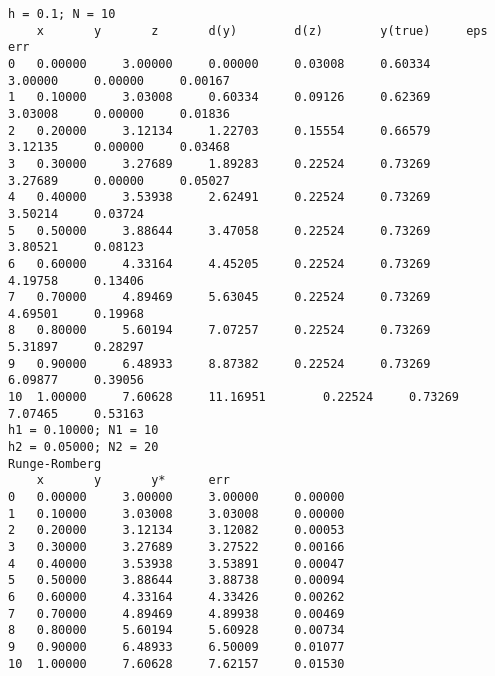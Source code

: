\begin{verbatim}
h = 0.1; N = 10
	x		y		z		d(y)		d(z)		y(true)		eps		err
0	0.00000		3.00000		0.00000		0.03008		0.60334		3.00000		0.00000		0.00167
1	0.10000		3.03008		0.60334		0.09126		0.62369		3.03008		0.00000		0.01836
2	0.20000		3.12134		1.22703		0.15554		0.66579		3.12135		0.00000		0.03468
3	0.30000		3.27689		1.89283		0.22524		0.73269		3.27689		0.00000		0.05027
4	0.40000		3.53938		2.62491		0.22524		0.73269		3.50214		0.03724
5	0.50000		3.88644		3.47058		0.22524		0.73269		3.80521		0.08123
6	0.60000		4.33164		4.45205		0.22524		0.73269		4.19758		0.13406
7	0.70000		4.89469		5.63045		0.22524		0.73269		4.69501		0.19968
8	0.80000		5.60194		7.07257		0.22524		0.73269		5.31897		0.28297
9	0.90000		6.48933		8.87382		0.22524		0.73269		6.09877		0.39056
10	1.00000		7.60628		11.16951		0.22524		0.73269		7.07465		0.53163
h1 = 0.10000; N1 = 10
h2 = 0.05000; N2 = 20
Runge-Romberg
	x		y		y*		err
0	0.00000		3.00000		3.00000		0.00000
1	0.10000		3.03008		3.03008		0.00000
2	0.20000		3.12134		3.12082		0.00053
3	0.30000		3.27689		3.27522		0.00166
4	0.40000		3.53938		3.53891		0.00047
5	0.50000		3.88644		3.88738		0.00094
6	0.60000		4.33164		4.33426		0.00262
7	0.70000		4.89469		4.89938		0.00469
8	0.80000		5.60194		5.60928		0.00734
9	0.90000		6.48933		6.50009		0.01077
10	1.00000		7.60628		7.62157		0.01530
\end{verbatim}

\pagebreak
